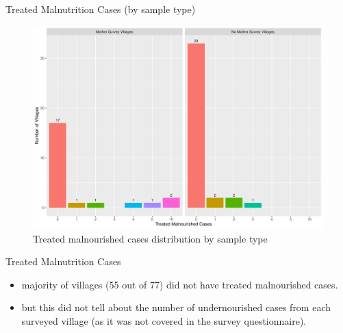 \documentclass[
  ignorenonframetext,
]{beamer}
\providecommand{\tightlist}{%
  \setlength{\itemsep}{0pt}\setlength{\parskip}{0pt}}
\begin{document}
\begin{frame}{Treated Malnutrition Cases (by sample type)}
\protect\hypertarget{treated-malnutrition-cases-by-sample-type}{}
\begin{figure}
\includegraphics[width=1\linewidth]{example_plots_files/figure-beamer/unnamed-chunk-11-1} \caption{Treated malnourished cases distribution by sample type}\label{fig:unnamed-chunk-11}
\end{figure}
\end{frame}

\begin{frame}{Treated Malnutrition Cases}
\protect\hypertarget{treated-malnutrition-cases}{}
\begin{itemize}
\tightlist
\item
  majority of villages (55 out of 77) did not have treated malnourished
  cases.
\item
  but this did not tell about the number of undernourished cases from
  each surveyed village (as it was not covered in the survey
  questionnaire).
\end{itemize}
\end{frame}
\end{document}
